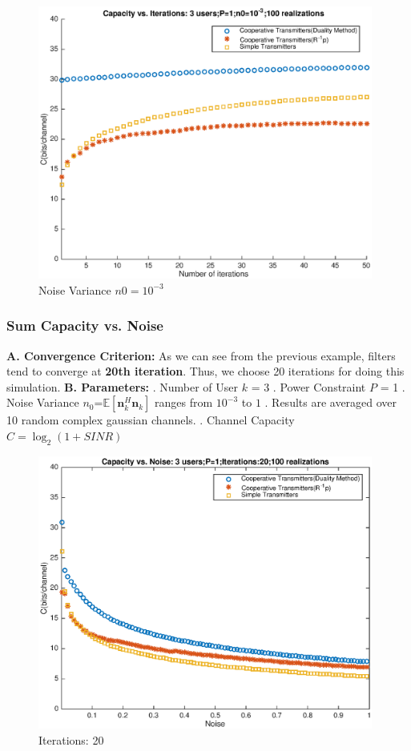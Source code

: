 \documentclass[11pt, oneside]{article}   	%
\begin{document}
\begin{figure}[H]
    \centering
    \centerline{\includegraphics[width=110mm]{6}}
    \caption{Noise Variance $n0=10^{-3}$}
\end{figure} 

\subsubsection{Sum Capacity vs. Noise}
\textbf{A. Convergence Criterion:} As we can see from the previous example, filters tend to converge at \textbf{20th iteration}. Thus, we choose 20 iterations for doing this simulation.
\newline
\textbf{B. Parameters:}
. Number of User $k$ = 3
. Power Constraint $P$ = 1
. Noise Variance $n_0$=$\mathbb{E}[\textbf{n}_k^{H}\textbf{n}_k]$ ranges from $10^{-3}$ to $1$
. Results are averaged over 10 random complex gaussian channels.
. Channel Capacity $C = \log_2 ({1+SINR})$

\begin{figure}[H]
    \centering
    \centerline{\includegraphics[width=110mm]{noise}}
    \caption{Iterations: 20}
\end{figure} 
\end{document}
